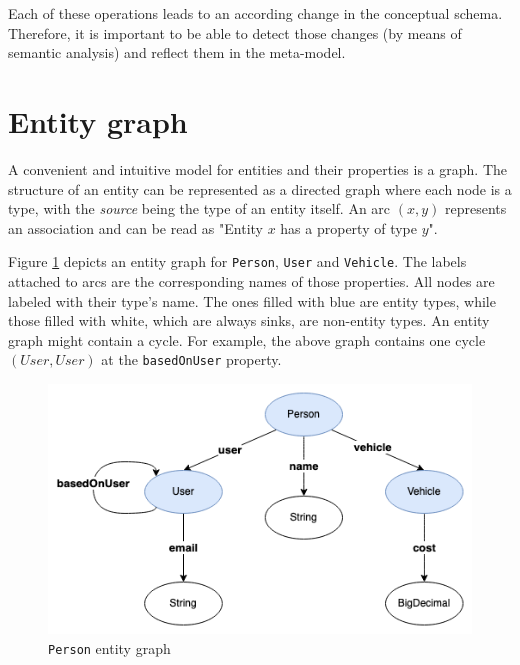 Each of these operations leads to an according change in the conceptual schema. Therefore, it is important to be able to detect those changes (by means of semantic analysis) and reflect them in the meta-model.

\section{Entity graph}
A convenient and intuitive model for entities and their properties is a graph.
The structure of an entity can be represented as a directed graph where each node is a type, with the \textit{source} being the type of an entity itself.
An arc $(x, y)$ represents an association and can be read as "Entity $x$ has a property of type $y$". 

\n

Figure \ref{fig:entity-graph} depicts an entity graph for \texttt{Person}, \texttt{User} and \texttt{Vehicle}.
The labels attached to arcs are the corresponding names of those properties.
All nodes are labeled with their type’s name.
The ones filled with blue are entity types, while those filled with white, which are always sinks, are non-entity types.
An entity graph might contain a cycle.
For example, the above graph contains one cycle $(User, User)$ at the \texttt{basedOnUser} property.

\begin{figure}[H]\centering
    \includegraphics[scale=0.65]{images/entity-graph.drawio.png}
    \caption{\texttt{Person} entity graph}\label{fig:entity-graph}
\end{figure}

